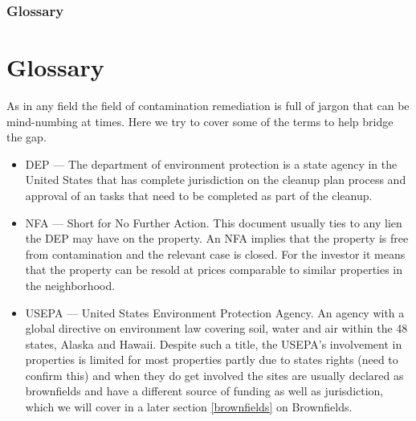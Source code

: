 \documentclass{beamer}
\begin{document}
\begin{frame}
\frametitle {Glossary}
\section{Glossary}
As in any field the field of contamination remediation is full of jargon that can be mind-numbing at times. Here we try to cover some of the terms to help bridge the gap.
\begin{itemize}
  \item DEP --- The department of environment protection is a state agency in the United States that has complete jurisdiction on the cleanup plan process and approval of an tasks that need to be completed as part of the cleanup. 
  \item NFA --- Short for No Further Action. This document usually ties to any lien the DEP may have on the property. An NFA implies that the property is free from contamination and the relevant case is closed. For the investor it means that the property can be resold at prices comparable to similar properties in the neighborhood.
  \item USEPA --- United States Environment Protection Agency. An agency with a global directive on environment law covering soil, water and air within the 48 states, Alaska and Hawaii. Despite such a title, the USEPA's involvement in properties is limited for most properties partly due to states rights (need to confirm this) and when they do get involved the sites are usually declared as brownfields and have a different source of funding as well as jurisdiction, which we will cover in a later section \ref{brownfields} on Brownfields.
\end{itemize}
\end{frame}
\end{document}
